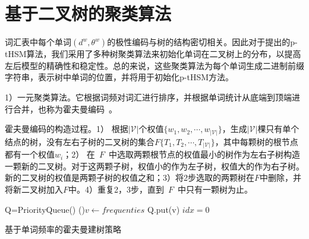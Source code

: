 \section{基于二叉树的聚类算法}
词汇表中每个单词$(d^w,\theta^w)$的极性编码与树的结构密切相关。因此对于提出的p-tHSM算法，我们采用了多种树聚类算法来初始化单词在二叉树上的分布，以提高左后模型的精确性和稳定性。总的来说，这些聚类算法为每个单词生成二进制前缀字符串，表示树中单词的位置，并将用于初始化p-tHSM方法。


1）一元聚类算法。它根据词频对词汇进行排序，并根据单词统计从底端到顶端进行合并，也称为霍夫曼编码~。

霍夫曼编码的构造过程。1） 根据$\mathcal{|V|}$个权值$\{w_1,w_2,\cdots,w_{\mathcal{|V|}}\}$，生成$\mathcal{|V|}$棵只有单个结点的树，没有左右子树的二叉树的集合$F\{T_1,T_2,\cdots,T_{\mathcal{|V|}}\}$，其中每颗树的根节点都有一个权值$w_i$；2） 在~$F$~中选取两颗根节点的权值最小的树作为左右子树构造一颗新的二叉树。对于这两颗子树，权值小的作为左子树，权值大的作为右子树。新的二叉树的权值是两颗子树的权值之和；3）将2步选取的两颗树在$F$中删除，并将新二叉树加入$F$中。4）重复2，3步，直到~$F$~中只有一颗树为止。

\begin{algorithm}[!ht]
\SetAlgoLined
{}
{Q=PriorityQueue()} 
\For(){$v \gets frequenties$}{
{Q.put(v)}\;
}
{$idx=0$}\;
\caption{基于单词频率的霍夫曼建树策略}\label{code:huffman}
\end{algorithm}

